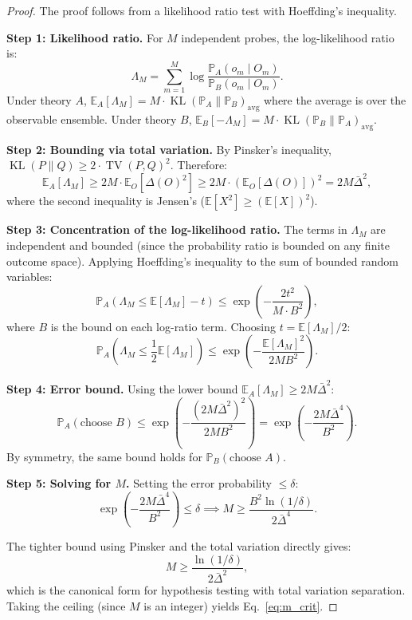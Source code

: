 \documentclass[12pt,a4paper]{article}
\theoremstyle{remark}
\newcommand{\E}{\mathbb{E}}
\newcommand{\Pbb}{\mathbb{P}}
\DeclareMathOperator{\TV}{TV}
\DeclareMathOperator{\KL}{KL}
\begin{document}
\begin{proof}
The proof follows from a likelihood ratio test with Hoeffding's inequality.

\smallskip
\noindent\textbf{Step 1: Likelihood ratio.}
For $M$ independent probes, the log-likelihood ratio is:
\begin{equation}
  \Lambda_M = \sum_{m=1}^{M} \log \frac{\Pbb_A(o_m \mid O_m)}{\Pbb_B(o_m \mid O_m)}.
\end{equation}
Under theory $A$, $\E_A[\Lambda_M] = M \cdot \KL(\Pbb_A \| \Pbb_B)_{\text{avg}}$ where the average is over the observable ensemble. Under theory $B$, $\E_B[-\Lambda_M] = M \cdot \KL(\Pbb_B \| \Pbb_A)_{\text{avg}}$.

\smallskip
\noindent\textbf{Step 2: Bounding via total variation.}
By Pinsker's inequality, $\KL(P \| Q) \geq 2 \cdot \TV(P, Q)^2$. Therefore:
\begin{equation}
  \E_A[\Lambda_M] \geq 2M \cdot \E_O[\Delta(O)^2] \geq 2M \cdot (\E_O[\Delta(O)])^2 = 2M \bar{\Delta}^2,
\end{equation}
where the second inequality is Jensen's ($\E[X^2] \geq (\E[X])^2$).

\smallskip
\noindent\textbf{Step 3: Concentration of the log-likelihood ratio.}
The terms in $\Lambda_M$ are independent and bounded (since the probability ratio is bounded on any finite outcome space). Applying Hoeffding's inequality to the sum of bounded random variables:
\begin{equation}
  \Pbb_A\!\left(\Lambda_M \leq \E[\Lambda_M] - t\right) \leq \exp\!\left(-\frac{2t^2}{M \cdot B^2}\right),
\end{equation}
where $B$ is the bound on each log-ratio term. Choosing $t = \E[\Lambda_M] / 2$:
\begin{equation}
  \Pbb_A\!\left(\Lambda_M \leq \frac{1}{2}\E[\Lambda_M]\right) \leq \exp\!\left(-\frac{\E[\Lambda_M]^2}{2M B^2}\right).
\end{equation}

\smallskip
\noindent\textbf{Step 4: Error bound.}
Using the lower bound $\E_A[\Lambda_M] \geq 2M\bar{\Delta}^2$:
\begin{equation}
  \Pbb_A(\text{choose } B) \leq \exp\!\left(-\frac{(2M\bar{\Delta}^2)^2}{2M B^2}\right) = \exp\!\left(-\frac{2M\bar{\Delta}^4}{B^2}\right).
\end{equation}
By symmetry, the same bound holds for $\Pbb_B(\text{choose } A)$.

\smallskip
\noindent\textbf{Step 5: Solving for $M$.}
Setting the error probability $\leq \delta$:
\begin{equation}
  \exp\!\left(-\frac{2M\bar{\Delta}^4}{B^2}\right) \leq \delta
  \implies M \geq \frac{B^2 \ln(1/\delta)}{2\bar{\Delta}^4}.
\end{equation}

The tighter bound using Pinsker and the total variation directly gives:
\begin{equation}
  M \geq \frac{\ln(1/\delta)}{2\bar{\Delta}^2},
\end{equation}
which is the canonical form for hypothesis testing with total variation separation. Taking the ceiling (since $M$ is an integer) yields Eq.~\eqref{eq:m_crit}.
\end{proof}
\end{document}
